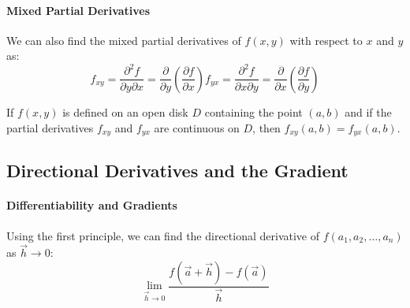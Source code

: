 \documentclass[11pt]{article}
\begin{document}
\paragraph{Mixed Partial Derivatives} We can also find the mixed partial derivatives of $f(x, y)$ with respect to $x$ and $y$ as:
\begin{subequations}
    \begin{equation}
    f_{xy} = \frac{\partial^2 f}{\partial y \partial x} = \frac{\partial}{\partial y} \left( \frac{\partial f}{\partial x} \right)
    \end{equation}
    \begin{equation}
    f_{yx} = \frac{\partial^2 f}{\partial x \partial y} = \frac{\partial}{\partial x} \left( \frac{\partial f}{\partial y} \right)
    \end{equation}
\end{subequations}
\begin{theorem}
    If $f(x, y)$ is defined on an open disk $D$ containing the point $(a, b)$ and if the partial derivatives $f_{xy}$ and $f_{yx}$ are continuous on $D$, then $f_{xy}(a, b) = f_{yx}(a, b)$.
\end{theorem}
\subsection{Directional Derivatives and the Gradient}
\paragraph{Differentiability and Gradients} Using the first principle, we can find the directional derivative of $f(a_1, a_2, \dots, a_n)$ as $\vec{h} \to 0$:
\begin{equation}
    \lim_{\vec{h} \to 0} \frac{f(\vec{a} + \vec{h}) - f(\vec{a})}{\vec{h}}
\end{equation}
\end{document}
